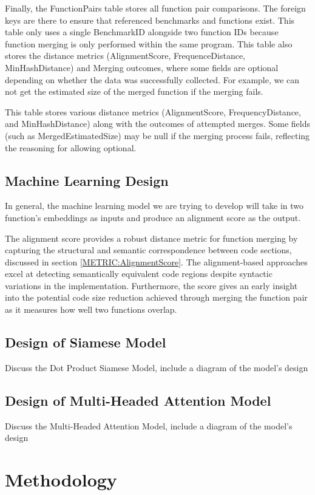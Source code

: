 Finally, the FunctionPairs table stores all function pair comparisons. The foreign keys are there to ensure that referenced benchmarks and functions exist. This table only uses a single BenchmarkID alongside two function IDs because function merging is only performed within the same program. This table also stores the distance metrics (AlignmentScore, FrequenceDistance, MinHashDistance) and Merging outcomes, where some fields are optional depending on whether the data was successfully collected. For example, we can not get the estimated size of the merged function if the merging fails.

This table stores various distance metrics (AlignmentScore, FrequencyDistance, and MinHashDistance) along with the outcomes of attempted merges. Some fields (such as MergedEstimatedSize) may be null if the merging process fails, reflecting the reasoning for allowing optional.

\subsection{Machine Learning Design}
In general, the machine learning model we are trying to develop will take in two function's embeddings as inputs and produce an alignment score as the output.

The alignment score provides a robust distance metric for function merging by capturing the structural and semantic correspondence between code sections, discussed in section \ref{METRIC:AlignmentScore}. The alignment-based approaches excel at detecting semantically equivalent code regions despite syntactic variations in the implementation. Furthermore, the score gives an early insight into the potential code size reduction achieved through merging the function pair as it measures how well two functions overlap. 

\subsection{Design of Siamese Model}
Discuss the Dot Product Siamese Model, include a diagram of the model's design
\subsection{Design of Multi-Headed Attention Model}
Discuss the Multi-Headed Attention Model, include a diagram of the model's design

\section{Methodology}
